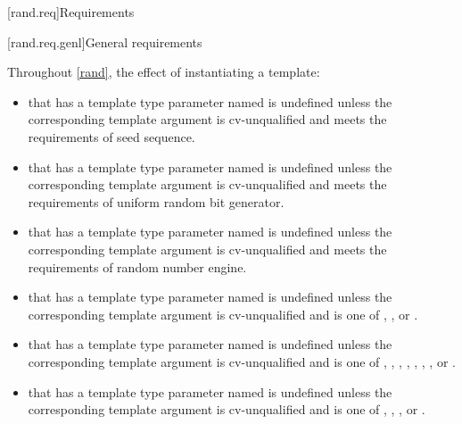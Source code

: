 
[rand.req]{Requirements}%


[rand.req.genl]{General requirements}%

\pnum
Throughout \ref{rand},
the effect of instantiating a template:
\begin{itemize}
  \item
    that has a template type parameter
    named 
    is undefined unless the corresponding template argument
    is cv-unqualified and
    meets the requirements
    of seed sequence.
  \item
    that has a template type parameter
    named 
    is undefined unless the corresponding template argument
    is cv-unqualified and
    meets the requirements
    of uniform random bit generator.
  \item
    that has a template type parameter
    named 
    is undefined unless the corresponding template argument
    is cv-unqualified and
    meets the requirements
    of random number engine.
  \item
    that has a template type parameter
    named 
    is undefined unless the corresponding template argument
    is cv-unqualified and
    is one of
    , , or .
  \item
    that has a template type parameter
    named 
    is undefined unless the corresponding template argument
    is cv-unqualified and
    is one of
      ,
      ,
      ,
      ,
      ,
      ,
      ,
      or
      .
  \item
    that has a template type parameter
    named 
    is undefined unless the corresponding template argument
    is cv-unqualified and
    is one of
      ,
      ,
      ,
      or
      .
\end{itemize}

